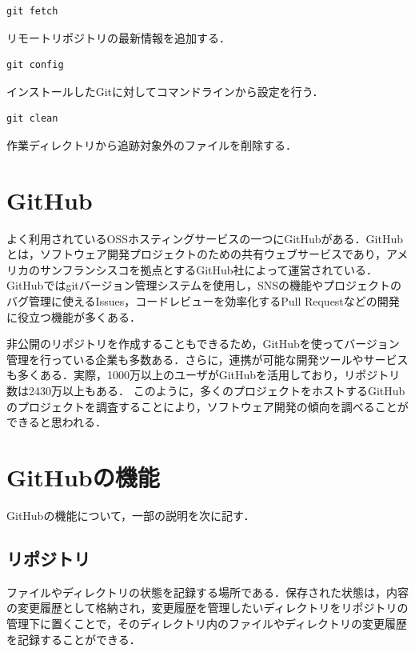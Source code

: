 \hfil
\begin{lstlisting}[basicstyle=\ttfamily\footnotesize, frame=single]
git fetch
\end{lstlisting}
リモートリポジトリの最新情報を追加する．

\hfil
\begin{lstlisting}[basicstyle=\ttfamily\footnotesize, frame=single]
git config 
\end{lstlisting}
インストールしたGitに対してコマンドラインから設定を行う．

\hfil
\begin{lstlisting}[basicstyle=\ttfamily\footnotesize, frame=single]
git clean
\end{lstlisting}
作業ディレクトリから追跡対象外のファイルを削除する．

\newpage

\section{GitHub}
よく利用されているOSSホスティングサービスの一つにGitHubがある．GitHubとは，ソフトウェア開発プロジェクトのための共有ウェブサービスであり，アメリカのサンフランシスコを拠点とするGitHub社によって運営されている．GitHubではgitバージョン管理システムを使用し，SNSの機能やプロジェクトのバグ管理に使えるIssues，コードレビューを効率化するPull Requestなどの開発に役立つ機能が多くある．

非公開のリポジトリを作成することもできるため，GitHubを使ってバージョン管理を行っている企業も多数ある．さらに，連携が可能な開発ツールやサービスも多くある．実際，1000万以上のユーザがGitHubを活用しており，リポジトリ数は2430万以上もある．
このように，多くのプロジェクトをホストするGitHubのプロジェクトを調査することにより，ソフトウェア開発の傾向を調べることができると思われる\cite{github}．


\section{GitHubの機能}
GitHubの機能について，一部の説明を次に記す．

\subsection{リポジトリ}
ファイルやディレクトリの状態を記録する場所である．保存された状態は，内容の変更履歴として格納され，変更履歴を管理したいディレクトリをリポジトリの管理下に置くことで，そのディレクトリ内のファイルやディレクトリの変更履歴を記録することができる．

